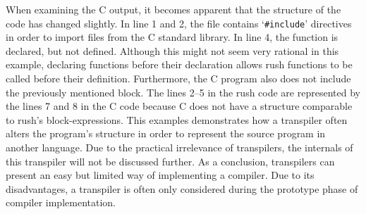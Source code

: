 When examining the C output, it becomes apparent that the structure of the code has changed slightly.
In line 1 and 2, the file contains `\texttt{\#include}' directives in order to import files from the C standard library.
In line 4, the  function is declared, but not defined.
Although this might not seem very rational in this example,
declaring functions before their declaration allows rush functions to be called before their definition.
Furthermore, the C program also does not include the previously mentioned block.
The lines 2--5 in the rush code are represented by the lines 7 and 8 in the C code because C does not have a structure comparable to rush's block-expressions.
This examples demonstrates how a transpiler often alters the program's structure in order to represent the source program in another language.
Due to the practical irrelevance of transpilers, the internals of this transpiler will not be discussed further.
As a conclusion, transpilers can present an easy but limited way of implementing a compiler.
Due to its disadvantages, a transpiler is often only considered during the prototype phase of compiler implementation.
